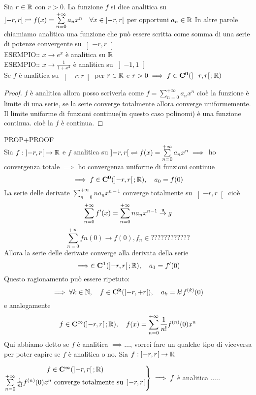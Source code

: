 Sia $r\in \mathbb{R}$ con $r>0$. La funzione $f$ si dice analitica su $\left]-r,r\right[ \rightleftharpoons f(x)=\sum\limits_{n=0}^{+\infty}a_nx^n \quad \forall x\in\left]-r,r\right[$ per opportuni $a_n\in \mathbb{R}$
\observation
In altre parole chiamiamo analitica una funzione che può essere scritta come somma di una serie di potenze convergente su $\left]-r,r\right[$ \\
ESEMPIO:: $x\to e^x$ è analitica su $ \mathbb{R}$\\
ESEMPIO:: $x\to\frac{1}{1+x^2}$ è analitica su $\left]-1,1\right[$\\
\proposition
Se $f$ è analitica su $\left]-r;r\right[$ per $r\in \mathbb{R}$ e $r>0 \implies f\in \mathbf{C^{0}}(\left]-r,r\right[; \mathbb{R})$
\begin{proof}
	$f$ è analitica  allora posso scriverla come $f=\sum\limits_{n=0}^{+\infty}a_nx^n$ cioè la funzione è limite di una serie, se la serie converge totalmente allora converge uniformemente. Il limite uniforme di funzioni continue(in questo caso polinomi) è una funzione continua. cioè la $f$ è continua.
\end{proof}
\proposition PROP+PROOF\\
Sia $f:\left]-r,r\right[\to \mathbb{R}$ e $f$ analitica su $\left]-r,r\right[ \rightleftharpoons f(x)=\sum\limits_{n=0}^{+\infty}a_nx^n \implies$ ho convergenza totale $\implies$ ho convergenza uniforme di funzioni continue
\[\implies f\in \mathbf{C^{0}}(\left]-r,r\right[; \mathbb{R}),\quad a_0=f(0)\]
La serie delle derivate $\sum\limits_{n=0}^{+\infty}na_nx^{n-1}$ converge totalmente su $\left]-r,r\right[$ cioè
\[\sum\limits_{n=0}^{+\infty}f'(x)=\sum\limits_{n=0}^{+\infty}na_nx^{n-1} \overset{\text{u}}{\to} g\]
\[\sum\limits_{n=0}^{+\infty}fn(0)\to f(0), f_n\in ????????????\]
Allora la serie delle derivate converge alla derivata della serie
\[\implies \in \mathbf{C^{1}}(\left]-r,r\right[; \mathbb{R}),\quad a_1=f'(0)\]
Questo ragionamento può essere ripetuto:
\[\implies \forall k\in\mathbb{N},\quad f\in \mathbf{C^{k}}(\left]-r,+r\right[),\quad a_k=k!f^{(k)}(0)\]
e analogamente
\[f\in \mathbf{C^{\infty}}(\left]-r,r\right[; \mathbb{R}),\quad f(x)=\sum\limits_{n=0}^{+\infty}\frac{1}{n!}f^{(n)}(0)x^n\]
\observation Qui abbiamo detto se $f$ è analitica $\implies \ldots$, vorrei fare un qualche tipo di viceversa per poter capire se $f$ è analitica o no.
\proposition
Sia $f:\left]-r,r\right[\to \mathbb{R}$
\begin{center}
	$\left.\begin{matrix}
	f\in \mathbf{C^{\infty}}(\left]-r,r\right[; \mathbb{R})\\
	\sum\limits_{n=0}^{+\infty}\frac{1}{n!}f^{(n)}(0)x^n\text{ converge totalmente su } \left]-r,r\right[\\
	\end{matrix}\right\}\implies f$ è analitica  .....
\end{center}
